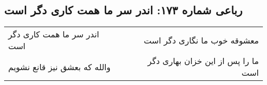 \begin{center}
\section*{رباعی شماره ۱۷۳: اندر سر ما همت کاری دگر است}
\label{sec:0173}
\begin{longtable}{l p{0.5cm} r}
اندر سر ما همت کاری دگر است
&&
معشوقه خوب ما نگاری دگر است
\\
والله که بعشق نیز قانع نشویم
&&
ما را پس از این خزان بهاری دگر است
\\
\end{longtable}
\end{center}
